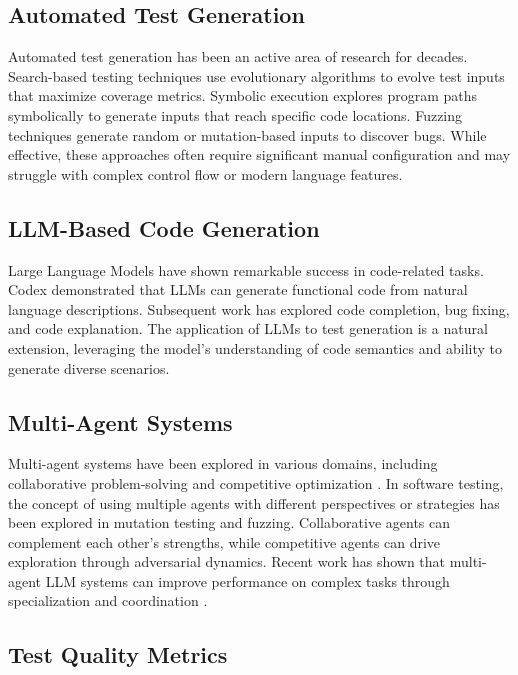 \documentclass[11pt]{article}
\begin{document}
\subsection{Automated Test Generation}

Automated test generation has been an active area of research for decades. Search-based testing techniques \cite{McMinn2004} use evolutionary algorithms to evolve test inputs that maximize coverage metrics. Symbolic execution \cite{Cadar2008} explores program paths symbolically to generate inputs that reach specific code locations. Fuzzing techniques \cite{Manes2019} generate random or mutation-based inputs to discover bugs. While effective, these approaches often require significant manual configuration and may struggle with complex control flow or modern language features.

\subsection{LLM-Based Code Generation}

Large Language Models have shown remarkable success in code-related tasks. Codex \cite{Chen2021} demonstrated that LLMs can generate functional code from natural language descriptions. Subsequent work has explored code completion, bug fixing, and code explanation. The application of LLMs to test generation is a natural extension, leveraging the model's understanding of code semantics and ability to generate diverse scenarios.

\subsection{Multi-Agent Systems}

Multi-agent systems have been explored in various domains, including collaborative problem-solving and competitive optimization \cite{Stone2007}. In software testing, the concept of using multiple agents with different perspectives or strategies has been explored in mutation testing and fuzzing. Collaborative agents can complement each other's strengths, while competitive agents can drive exploration through adversarial dynamics. Recent work has shown that multi-agent LLM systems can improve performance on complex tasks through specialization and coordination \cite{Wang2023}.

\subsection{Test Quality Metrics}
\end{document}
